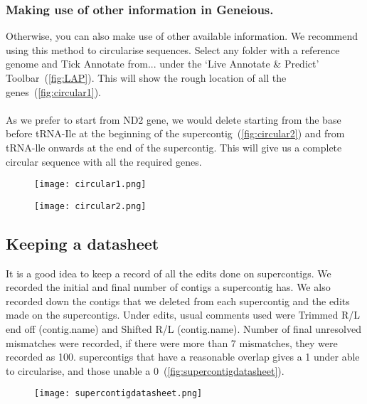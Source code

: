 \documentclass[11pt]{article}
\begin{document}
\subsubsection{Making use of other information in Geneious.}
Otherwise, you can also make use of other available information. We recommend using this method to circularise sequences. Select any folder with a reference genome and Tick Annotate from... under the `Live Annotate \& Predict' Toolbar~(\autoref{fig:LAP}). This will show the rough location of all the genes~(\autoref{fig:circular1}). 
\\
\\
As we prefer to start from ND2 gene, we would delete starting from the base before tRNA-Ile at the beginning of the supercontig~(\autoref{fig:circular2}) and from tRNA-lle onwards at the end of the supercontig. This will give us a complete circular sequence with all the required genes. 

\begin{figure}[H]
  \centering
    \texttt{[image: circular1.png]}
  \label{fig:circular1}
\end{figure}

\begin{figure}[H]
  \centering
    \texttt{[image: circular2.png]}
  \label{fig:circular2}
\end{figure}
 

\subsection{Keeping a datasheet}
It is a good idea to keep a record of all the edits done on supercontigs. We recorded the initial and final number of contigs a supercontig has. We also recorded down the contigs that we deleted from each supercontig and the edits made on the supercontigs. Under edits, usual comments used were Trimmed R/L end off (contig.name) and Shifted R/L (contig.name). Number of final unresolved mismatches were recorded, if there were more than 7 mismatches, they were recorded as 100. supercontigs that have a reasonable overlap gives a 1 under able to circularise, and those unable a 0~(\autoref{fig:supercontigdatasheet}).

\begin{figure}[H]
  \centering
    \texttt{[image: supercontigdatasheet.png]}
  \label{fig:supercontigdatasheet}
\end{figure}
\end{document}

